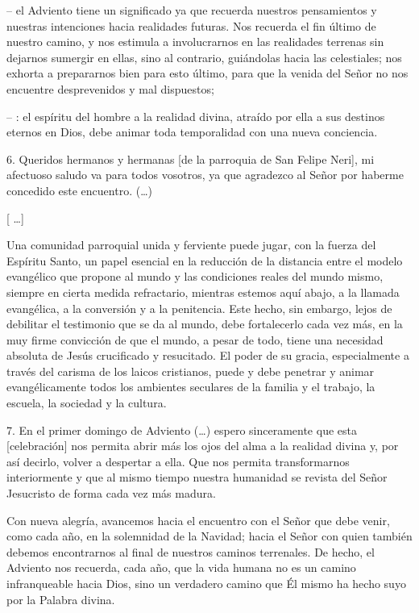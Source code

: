 \begin{body}
	-- el Adviento tiene un significado  ya que recuerda nuestros pensamientos y nuestras intenciones hacia realidades futuras. Nos recuerda el fin último de nuestro camino, y nos estimula a involucrarnos en las realidades terrenas sin dejarnos sumergir en ellas, sino al contrario, guiándolas hacia las celestiales; nos exhorta a prepararnos bien para esto último, para que la venida del Señor no nos encuentre desprevenidos y mal dispuestos; 
	
	-- : el espíritu del hombre  a la realidad divina, atraído por ella a sus destinos eternos en Dios, debe animar toda temporalidad con una nueva conciencia. 
	
	6. Queridos hermanos y hermanas {[}de la parroquia de San Felipe Neri{]}, mi afectuoso saludo va para todos vosotros, ya que agradezco al Señor por haberme concedido este encuentro. (\ldots{}) 
	
	{[} \ldots{}{]} 
	
	Una comunidad parroquial unida y ferviente puede jugar, con la fuerza del Espíritu Santo, un papel esencial en la reducción de la distancia entre el modelo evangélico que propone al mundo y las condiciones reales del mundo mismo, siempre en cierta medida refractario, mientras estemos aquí abajo, a la llamada evangélica, a la conversión y a la penitencia. Este hecho, sin embargo, lejos de debilitar el testimonio que se da al mundo, debe fortalecerlo cada vez más, en la muy firme convicción de que el mundo, a pesar de todo, tiene una necesidad absoluta de Jesús crucificado y resucitado. El poder de su gracia, especialmente a través del carisma de los laicos cristianos, puede y debe penetrar y animar evangélicamente todos los ambientes seculares de la familia y el trabajo, la escuela, la sociedad y la cultura. 
	
	7. En el primer domingo de Adviento (\ldots{}) espero sinceramente que esta {[}celebración{]} nos permita abrir más los ojos del alma a la realidad divina y, por así decirlo, volver a despertar a ella. Que nos permita transformarnos interiormente y que al mismo tiempo nuestra humanidad se revista del Señor Jesucristo de forma cada vez más madura. 
	
	Con nueva alegría, avancemos hacia el encuentro con el Señor que debe venir, como cada año, en la solemnidad de la Navidad; hacia el Señor con quien también debemos encontrarnos al final de nuestros caminos terrenales. De hecho, el Adviento nos recuerda, cada año, que la vida humana no es un camino infranqueable hacia Dios, sino un verdadero camino que Él mismo ha hecho suyo por la Palabra divina.
\end{body}

